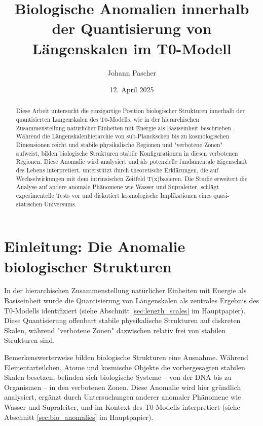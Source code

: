 \documentclass[12pt,a4paper]{article}
\title{Biologische Anomalien innerhalb der Quantisierung von Längenskalen im T0-Modell}
\author{Johann Pascher}
\date{12. April 2025}
\newcommand{\Tfield}{T(x)}
\begin{document}
	
	\maketitle
	
	\begin{abstract}
		Diese Arbeit untersucht die einzigartige Position biologischer Strukturen innerhalb der quantisierten Längenskalen des T0-Modells, wie in der hierarchischen Zusammenstellung natürlicher Einheiten mit Energie als Basiseinheit beschrieben \cite{pascher_alphabeta_2025}. Während die Längenskalenhierarchie von sub-Planckschen bis zu kosmologischen Dimensionen reicht und stabile physikalische Regionen und "verbotene Zonen" aufweist, bilden biologische Strukturen stabile Konfigurationen in diesen verbotenen Regionen. Diese Anomalie wird analysiert und als potenzielle fundamentale Eigenschaft des Lebens interpretiert, unterstützt durch theoretische Erklärungen, die auf Wechselwirkungen mit dem intrinsischen Zeitfeld \Tfield basieren. Die Studie erweitert die Analyse auf andere anomale Phänomene wie Wasser und Supraleiter, schlägt experimentelle Tests vor und diskutiert kosmologische Implikationen eines quasi-statischen Universums.
	\end{abstract}
	
	\tableofcontents
	\newpage
	
	\section{Einleitung: Die Anomalie biologischer Strukturen}
	\label{sec:introduction}
	
	In der hierarchischen Zusammenstellung natürlicher Einheiten mit Energie als Basiseinheit \cite{pascher_alphabeta_2025} wurde die Quantisierung von Längenskalen als zentrales Ergebnis des T0-Modells identifiziert (siehe Abschnitt \ref{sec:length_scales} im Hauptpapier). Diese Quantisierung offenbart stabile physikalische Strukturen auf diskreten Skalen, während "verbotene Zonen" dazwischen relativ frei von stabilen Strukturen sind.
	
	Bemerkenswerterweise bilden biologische Strukturen eine Ausnahme. Während Elementarteilchen, Atome und kosmische Objekte die vorhergesagten stabilen Skalen besetzen, befinden sich biologische Systeme – von der DNA bis zu Organismen – in den verbotenen Zonen. Diese Anomalie wird hier gründlich analysiert, ergänzt durch Untersuchungen anderer anomaler Phänomene wie Wasser und Supraleiter, und im Kontext des T0-Modells interpretiert (siehe Abschnitt \ref{sec:bio_anomalies} im Hauptpapier).
	
\end{document}
